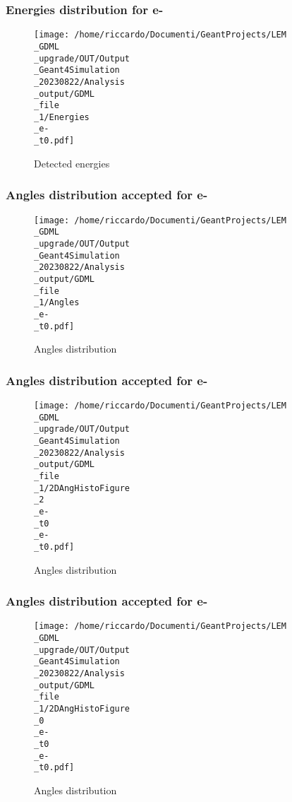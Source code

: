 \documentclass[8pt]{beamer}
\begin{document}
            \begin{frame}
                \frametitle{Energies distribution for e-}
            
        \begin{figure}[h]
            \centering
            \texttt{[image: /home/riccardo/Documenti/GeantProjects/LEM\\\_GDML\\\_upgrade/OUT/Output\\\_Geant4Simulation\\\_20230822/Analysis\\\_output/GDML\\\_file\\\_1/Energies\\\_e-\\\_t0.pdf]}
            \caption{Detected energies}
        \end{figure}
        
            \end{frame}
            
            \begin{frame}
                \frametitle{Angles distribution accepted for e-}
            
        \begin{figure}[h]
            \centering
            \texttt{[image: /home/riccardo/Documenti/GeantProjects/LEM\\\_GDML\\\_upgrade/OUT/Output\\\_Geant4Simulation\\\_20230822/Analysis\\\_output/GDML\\\_file\\\_1/Angles\\\_e-\\\_t0.pdf]}
            \caption{Angles distribution}
        \end{figure}
        
            \end{frame}
            
            \begin{frame}
                \frametitle{Angles distribution accepted for e-}
            
        \begin{figure}[h]
            \centering
            \texttt{[image: /home/riccardo/Documenti/GeantProjects/LEM\\\_GDML\\\_upgrade/OUT/Output\\\_Geant4Simulation\\\_20230822/Analysis\\\_output/GDML\\\_file\\\_1/2DAngHistoFigure\\\_2\\\_e-\\\_t0\\\_e-\\\_t0.pdf]}
            \caption{Angles distribution}
        \end{figure}
        
            \end{frame}
            
            \begin{frame}
                \frametitle{Angles distribution accepted for e-}
            
        \begin{figure}[h]
            \centering
            \texttt{[image: /home/riccardo/Documenti/GeantProjects/LEM\\\_GDML\\\_upgrade/OUT/Output\\\_Geant4Simulation\\\_20230822/Analysis\\\_output/GDML\\\_file\\\_1/2DAngHistoFigure\\\_0\\\_e-\\\_t0\\\_e-\\\_t0.pdf]}
            \caption{Angles distribution}
        \end{figure}
        
            \end{frame}
            
\end{document}
